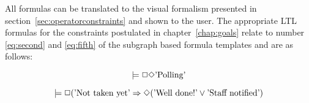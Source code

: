 All formulas can be translated to the visual formalism presented in section~\ref{sec:operatorconstraints} and shown to the user. The appropriate LTL formulas for the constraints postulated in chapter~\ref{chap:goals} relate to number \ref{eq:second} and \ref{eq:fifth} of the subgraph based formula templates and are as follows:

\begin{equation}
  \models \Box \Diamond \textnormal{'Polling'}
\end{equation}

\begin{equation}
	\models \Box (\textnormal{'Not taken yet'} \Rightarrow \Diamond (\textnormal{'Well done!'} \vee \textnormal{'Staff notified'})
\end{equation}
